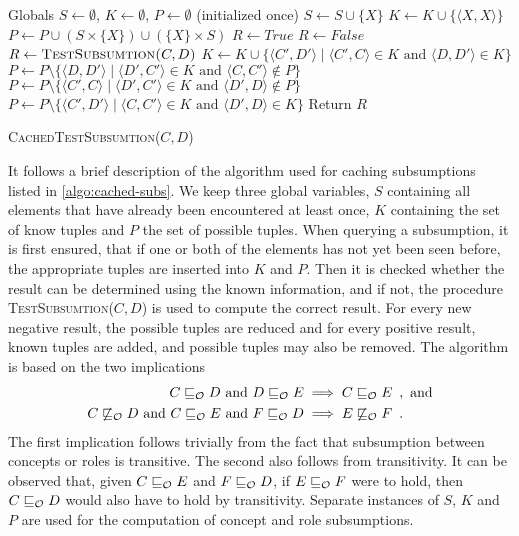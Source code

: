 \begin{algorithm}[ht]
  \begin{algorithmic}
    \State Globals \enspace $S \gets \emptyset$, \enspace $K \gets \emptyset$, \enspace $P \gets \emptyset$ \quad (initialized once)
      \State $S \gets S \cup \{ X \}$
      \State $K \gets K \cup \{ \langle X, X \rangle \}$
      \State $P \gets P \cup ( S \times \{ X \} ) \cup ( \{ X \} \times S )$
    \EndFor
      \State $R \gets \mathit{True}$
      \State $R \gets \mathit{False}$
    \Else
      \State $R \gets \textsc{TestSubsumtion($C, D$)}$
        \State $K \gets K \cup \{ \langle C', D' \rangle \mid \langle C', C \rangle \in K \text{ and } \langle D, D' \rangle \in K \}$
        \State $P \gets P \setminus \{ \langle D, D' \rangle \mid \langle D', C' \rangle \in K \text{ and } \langle C, C' \rangle \not\in P \}$
        \State $P \gets P \setminus \{ \langle C', C \rangle \mid \langle D', C' \rangle \in K \text{ and } \langle D', D \rangle \not\in P \}$
      \Else
        \State $P \gets P \setminus \{ \langle C', D' \rangle \mid \langle C, C' \rangle \in K \text{ and } \langle D', D \rangle \in K \}$
      \EndIf
    \EndIf
    \State Return $R$
  \end{algorithmic}
  \caption{\textsc{CachedTestSubsumtion}($C, D$)}
  \label{algo:cached-subs}
\end{algorithm}

It follows a brief description of the algorithm used for caching subsumptions listed in \cref{algo:cached-subs}. We keep three global variables, $S$ containing all elements that have already been encountered at least once, $K$ containing the set of know tuples and $P$ the set of possible tuples. When querying a subsumption, it is first ensured, that if one or both of the elements has not yet been seen before, the appropriate tuples are inserted into $K$ and $P$. Then it is checked whether the result can be determined using the known information, and if not, the procedure \textsc{TestSubsumtion($C, D$)} is used to compute the correct result. For every new negative result, the possible tuples are reduced and for every positive result, known tuples are added, and possible tuples may also be removed. The algorithm is based on the two implications
\begin{align*}
  C \sqsubseteq_\mathcal{O} D \text{ and } D \sqsubseteq_\mathcal{O} E &\implies C \sqsubseteq_\mathcal{O} E \enspace,\text{ and} \\
  C \not\sqsubseteq_\mathcal{O} D \text{ and } C \sqsubseteq_\mathcal{O} E \text{ and } F \sqsubseteq_\mathcal{O} D &\implies E \not\sqsubseteq_\mathcal{O} F \enspace.
\end{align*}
The first implication follows trivially from the fact that subsumption between concepts or roles is transitive. The second also follows from transitivity. It can be observed that, given $C \sqsubseteq_\mathcal{O} E$ and $F \sqsubseteq_\mathcal{O} D$, if $E \sqsubseteq_\mathcal{O} F$ were to hold, then $C \sqsubseteq_\mathcal{O} D$ would also have to hold by transitivity. Separate instances of $S$, $K$ and $P$ are used for the computation of concept and role subsumptions.

